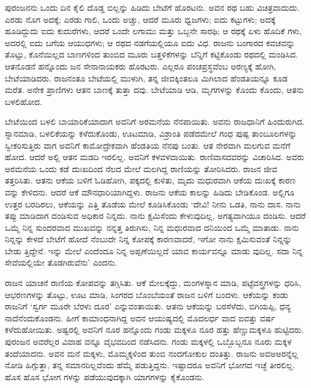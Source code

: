 ಪುರಂಜನನು ಒಂದು ದಿನ ಕೈಲಿ ದೊಡ್ಡ ಬಿಲ್ಲನ್ನು ಹಿಡಿದು ಬೇಟೆಗೆ ಹೊರಟನು. ಅವನ ರಥ ಬಹು ವಿಚಿತ್ರವಾದುದು. ಎರಡು ನೊಗ ಅದಕ್ಕೆ; ಎರಡು ಗಾಲಿ, ಒಂದು ಅಚ್ಚು, ಆದರೆ ಮೂರು ಧ್ವಜಗಳು; ಐದು ಕಟ್ಟುಗಳು; ಅದಕ್ಕೆ ಹೂಡಿದ್ದುದು ಐದು ಕುದುರೆಗಳು, ಆದರೆ ಒಂದೇ ಲಗಾಮು ಮತ್ತು ಒಬ್ಬನೇ ಸಾರಥಿ; ಆ ರಥಕ್ಕೆ ಏಳು ಹೊದಿಕೆ ಗಳು, ಅದರಲ್ಲಿ ಐದು ಬಗೆಯ ಆಯುಧಗಳು; ಆ ರಥದ ನಡಗೆಯಲ್ಲಿಯೂ ಐದು ವಿಧ. ರಾಜನು ಬಂಗಾರದ ಕವಚವನ್ನು ತೊಟ್ಟು, ಕೊನೆಯಿಲ್ಲದ ಬಾಣಗಳಿಂದ ತುಂಬಿದ ಮೂರು ಬತ್ತಳಿಕೆಗಳನ್ನು ಬೆನ್ನಿಗೆ ಕಟ್ಟಿಕೊಂಡು ರಥದಲ್ಲಿ ಮಂಡಿಸಿದ. ಆತನೊಡನೆ ಹನ್ನೊಂದು ಜನ ಸೇನಾನಾಯಕರು ಹೊರಟರು. ಎಲ್ಲರೂ ಪಂಚಪ್ರಸ್ಥವೆಂಬ ಅರಣ್ಯಕ್ಕೆ ಹೋಗಿ, ಬೇಟೆಯಾಡಿದರು. ರಾಜನಂತೂ ಬೇಟೆಯಲ್ಲಿ ಮುಳುಗಿ, ತನ್ನ ಜೀವಕ್ಕಿಂತಲೂ ಮಿಗಿಲಾದ ಹೆಂಡತಿಯನ್ನೂ ಕೂಡ ಮರೆತ. ಅನೇಕ ಪ್ರಾಣಿಗಳು ಆತನ ಬಾಣಕ್ಕೆ ತುತ್ತಾ ದವು. ಬೇಟೆಯಾಡಿ ಆಡಿ, ಮೃಗಗಳನ್ನು ಕೊಂದು ಕೊಂದು, ಆತನು ಬಳಲಿಹೋದ.

ಬೇಟೆಯಿಂದ ಬಳಲಿ ಬಾಯಾರಿಕೆಯಾದಾಗ ಅವನಿಗೆ ಅರಮನೆಯ ನೆನಪಾಯಿತು. ಅವನು ರಾಜಧಾನಿಗೆ ಹಿಂದುರುಗಿದ. ಸ್ನಾನಮಾಡಿ, ಬಳಲಿಕೆಯನ್ನು ಕಳೆದುಕೊಂಡು, ಊಟಮಾಡಿ, ವಿಶ್ರಾಂತಿ ಪಡೆದಮೇಲೆ ಗಂಧ ಪುಷ್ಪ ತಾಂಬೂಲಗಳನ್ನು ಸ್ವೀಕರಿಸುತ್ತಿರು ವಾಗ ಅವನಿಗೆ ಕಾಮೋದ್ರೇಕವಾಗಿ ಹೆಂಡತಿಯ ನೆನಪು ಬಂತು. ಆತ ನೇರವಾಗಿ ಮಲಗುವ ಮನೆಗೆ ಹೋದ. ಆದರೆ ಅಲ್ಲಿ ಆತನ ಮಡದಿ ಇರಲಿಲ್ಲ. ಅವನಿಗೆ ಕಳವಳವಾಯಿತು. ರಾಣಿವಾಸದವರನ್ನು ವಿಚಾರಿಸಿದ. ಅವರು ಅರಮನೆಯ ಒಂದು ಕಡೆ ದುಃಖದಿಂದ ನೆಲದ ಮೇಲೆ ಮಲಗಿದ್ದ ರಾಣಿಯನ್ನು ತೋರಿಸಿದರು. ರಾಜನ ಜೀವ ತತ್ತರಿಸಿತು. ಆತನು ಆಕೆಯ ಬಳಿಗೆ ಓಡಿಹೋಗಿ, ಪಕ್ಕದಲ್ಲಿ ಕುಳಿತು, ಮೃದು ಮಧುರವಾಗಿ ಆಕೆಯ ದುಃಖಕ್ಕೆ ಕಾರಣ ವನ್ನು ಕೇಳಿದನು. ಆದರೆ ಆಕೆ ಮೌನಧಾರಿಯಾಗಿದ್ದಳು. ರಾಜನು ಆಕೆಯ ಕಾಲನ್ನು ಹಿಡಿದು ಬೇಡಿಕೊಂಡ. ಅಲ್ಲಿಗೂ ಉತ್ತರ ಬರದಿರಲು, ಆಕೆಯನ್ನು ಎತ್ತಿ ತೊಡೆಯ ಮೇಲೆ ಕೂಡಿಸಿಕೊಂಡು ‘ದೇವಿ! ನೀನು ಒಡತಿ, ನಾನು ದಾಸ. ನಾನು ತಪ್ಪು ಮಾಡಿದಾಗ ದಂಡಿಸುವ ಅಧಿಕಾರ ನಿನ್ನದು. ನಾನು ಕ್ಷಮಿಸೆಂದು ಕೇಳುವುದಿಲ್ಲ, ಅಗತ್ಯವಾಗಿಯೂ ದಂಡಿಸು. ಆದರೆ ಒಮ್ಮೆ ನಿನ್ನ ಸುಂದರವಾದ ಮುಖವನ್ನು ನನ್ನತ್ತ ತಿರುಗಿಸು, ನಿನ್ನ ಮಧುರವಾದ ದನಿಯಿಂದ ಒಮ್ಮೆ ಮಾತಾಡು. ನಾನು ನಿನ್ನನ್ನು ಕೇಳದೆ ಬೇಟೆಗೆ ಹೋದೆ ನೆಂಬುದೇ ನಿನ್ನ ಕೋಪಕ್ಕೆ ಕಾರಣವಾದರೆ, ಇಗೋ ನಾನು ಕ್ಷಮಿಸುವಂತೆ ನಿನ್ನನ್ನು ಬೇಡು ತ್ತಿದ್ದೇನೆ. ಇನ್ನು ಮೇಲೆ ಎಂದೆಂದೂ ನಿನ್ನ ಅಪ್ಪಣೆಯಿಲ್ಲದೆ ಯಾವ ಕಾರ್ಯವನ್ನೂ ಮಾಡು ವುದಿಲ್ಲ. ಸದಾ ನಿನ್ನ ಸೇವೆಯಲ್ಲಿಯೇ ತೊಡಗಿರುವೆನು’ ಎಂದನು.

ರಾಜನ ಯಾಚನೆ ರಾಣಿಯ ಕೋಪವನ್ನು ತಗ್ಗಿಸಿತು. ಆಕೆ ಮೇಲಕ್ಕೆದ್ದು, ಮಂಗಳಸ್ನಾನ ಮಾಡಿ, ಪಟ್ಟೆವಸ್ತ್ರಗಳನ್ನು ಧರಿಸಿ, ಆಭರಣಗಳನ್ನು ತೊಟ್ಟು, ಊಟ ಮಾಡಿ, ಸಿಂಗರದ ಬೊಂಬೆಯಂತೆ ರಾಜನ ಬಳಿಗೆ ಬಂದಳು. ಆಕೆಯನ್ನು ಕಂಡು ರಾಜನಿಗೆ ‘ಸ್ವರ್ಗ ಮೂರೇ ಬೆರಳು ದೂರ’ ಎನ್ನುವಂತಾಯಿತು. ಆತನು ಆಕೆಯನ್ನು ಬರಸೆಳೆದು, ಬಿಗಿಯಪ್ಪಿ, ಧನ್ಯ ನಾದೆನೆಂದುಕೊಂಡನು. ಹೀಗೆ ಕಾಮಾಂಧನಾಗಿದ್ದ ಅವನ ಆಯುಷ್ಯದಲ್ಲಿ ಮೊದಲರ್ಧ ವಾದ ಐವತ್ತು ವರ್ಷ ಕಳೆದುಹೋಯಿತು. ಅಷ್ಟರಲ್ಲಿ ಅವನಿಗೆ ನೂರ ಹನ್ನೊಂದು ಗಂಡು ಮಕ್ಕಳೂ ನೂರ ಹತ್ತು ಹೆಣ್ಣುಮಕ್ಕಳೂ ಹುಟ್ಟಿದರು. ಪುರಂಜನ ಅವರೆಲ್ಲರ ವಿವಾಹ ವನ್ನೂ ವೈಭವದಿಂದ ನಡೆಸಿದನು. ಗಂಡು ಮಕ್ಕಳಲ್ಲಿ ಒಬ್ಬೊಬ್ಬನೂ ನೂರು ಮಕ್ಕಳ ತಂದೆಯಾದನು. ಅವನ ಮನೆ ಮಕ್ಕಳು, ಮೊಮ್ಮಕ್ಕಳಿಂದ ತುಂಬಿ ನಂದಗೋಕುಲ ದಂತಿತ್ತು. ರಾಜನು ಅವಅಅರನ್ನೆಲ್ಲ ನೋಡಿ ಹಿಗ್ಗುತ್ತಾ, ತನ್ನ ಸಮಾನರಿಲ್ಲವೆಂದು ಹೆಮ್ಮೆ ಪಡುತ್ತಿದ್ದನು. ಇಷ್ಟಾದರೂ ಅವನಿಗೆ ಭೋಗದ ಇಚ್ಛೆ ತೀರಲಿಲ್ಲ. ಹೊಸ ಹೊಸ ಭೋಗ ಗಳನ್ನು ಪಡೆಯುವುದಕ್ಕಾಗಿ ಯಾಗಗಳನ್ನು ಕೈಕೊಂಡನು.

